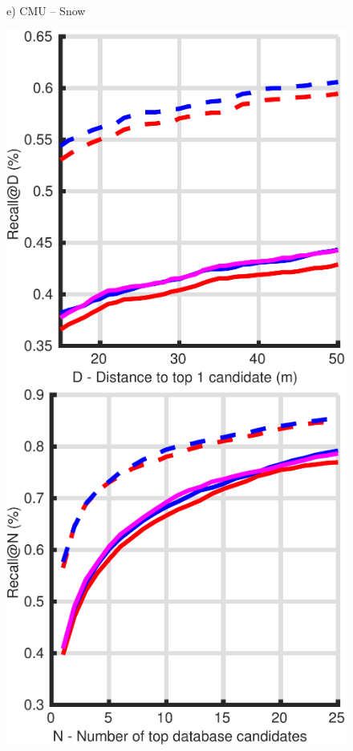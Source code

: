 \begin{figure}
\begin{minipage}{0.16\linewidth}
		e) CMU -- Snow
	\end{minipage}
	\begin{minipage}{0.16\linewidth}
		\center \scriptsize
		\includegraphics[width=\linewidth]{plot/oxf_cmu/Results_cmu_autumn/distance}	
		
		\includegraphics[width=\linewidth]{plot/oxf_cmu/Results_cmu_autumn/recall}
		

\end{minipage}
\end{figure}
